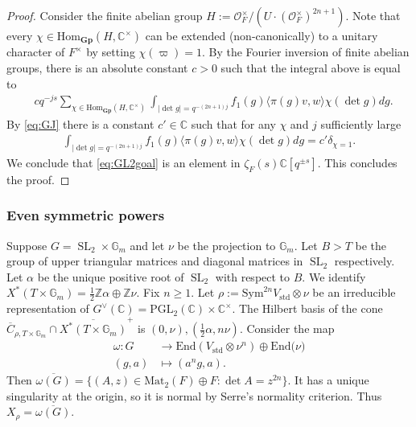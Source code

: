 \documentclass[10pt]{amsart}
\theoremstyle{definition}
\numberwithin{equation}{section}
\DeclareMathOperator{\SL}{\mathrm{SL}}
\numberwithin{equation}{subsection}
\newcommand{\ZZ}{\mathbb{Z}}
\newcommand{\CC}{\mathbb{C}}
\newcommand{\GG}{\mathbb{G}}
\begin{document}
\begin{proof}
Consider the finite abelian group $H:=\mathcal{O}_F^\times/(U\cdot(\mathcal{O}_F^\times)^{2n+1}).$ Note that every $\chi\in \mathrm{Hom}_{\mathbf{Gp}}(H,\CC^\times )$ can be extended (non-canonically) to a unitary character of $F^\times$ by setting $\chi(\varpi)=1.$ By the Fourier inversion of finite abelian groups, there is an absolute constant $c>0$ such that 
the integral above is equal to
\begin{align*}
     &cq^{-js}\sum_{\chi\in \mathrm{Hom}_{\mathbf{Gp}}(H,\CC^\times )}\int_{|\det g|=q^{-(2n+1)j}} f_1(g)\langle\pi(g)v ,w\rangle \chi(\det g)dg.
\end{align*}
By \eqref{eq:GJ} there is a constant $c'\in \CC$ such that for any $\chi$ and $j$ sufficiently large 
\begin{align*}
    \int_{|\det g|=q^{-(2n+1)j}} f_1(g)\langle\pi(g)v ,w\rangle \chi(\det g)dg=c'\delta_{\chi=1}.
\end{align*}
We conclude that \eqref{eq:GL2goal} is an element in $\zeta_F(s)\CC[q^{\pm s}]$. This concludes the proof. 
\end{proof}



\subsubsection{Even symmetric powers}

Suppose $G=\SL_2\times \GG_m$ and let $\nu$ be the projection to $\GG_m$. Let $B> T$ be the group of upper triangular matrices and diagonal matrices in $\SL_2$ respectively. Let $\alpha$ be the unique positive root of $\SL_2$ with respect to $B$. We identify $X^\ast(T\times \GG_m)=\frac{1}{2}\ZZ\alpha\oplus  \ZZ\nu$. Fix $n\ge 1.$ Let $\rho:=\mathrm{Sym}^{2n} V_{\mathrm{std}}\otimes \nu$ be an irreducible representation of $G^\vee(\CC)=\mathrm{PGL}_2(\CC)\times \CC^\times.$ The Hilbert basis of the cone $\overline{C}_{\rho,T\times\GG_m}\cap \overline{X^\ast(T\times \GG_m)}^+$ is $(0,\nu), (\frac{1}{2}\alpha,n\nu).$ Consider the map
\begin{align*}
    \omega:G&\longrightarrow \mathrm{End}(V_{\mathrm{std}}\otimes \nu^{n})\oplus \mathrm{End(}\nu)\\
    (g,a) &\mapsto \left(a^{n}g,a\right).
\end{align*}
Then $\overline{\omega(G)}=\{(A,z)\in \mathrm{Mat}_2(F)\oplus F: \det A=z^{2n}\}.$ It has a unique singularity at the origin, so it is normal by Serre's normality criterion. Thus $X_\rho=\overline{\omega(G)}.$
\end{document}
